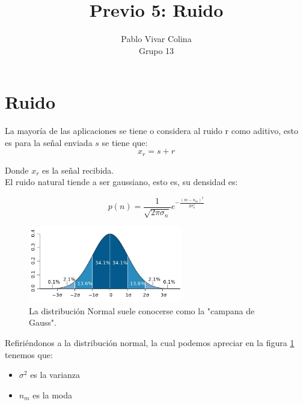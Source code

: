 \documentclass{article}
\title{Previo 5: Ruido}
\author{Pablo Vivar Colina\\
Grupo 13
}
\begin{document}
\maketitle

\section{Ruido}

La mayoría de las aplicaciones se tiene o considera al ruido r como aditivo, esto es para la señal enviada $s$ se tiene que:\citep{Capitulo1SC}\\

\begin{equation}
    x_r=s+r
\end{equation}

Donde $x_r$ es la señal recibida.\citep{Capitulo1SC}\\

El ruido natural tiende a ser gaussiano, esto es, su densidad es:\citep{Capitulo1SC}

\begin{equation}
    p(n)=\frac{1}{\sqrt{2 \pi \sigma_n}} e^{-\frac{(m-n_m)^2}{2 \sigma_n^2}}
\end{equation}

\begin{figure}[h!]
    \centering
    
   
\includegraphics[width=0.6\textwidth]{Imagenes/Standard_deviation_diagram.png}
\caption{ La distribución Normal suele conocerse como la "campana de Gauss".}
    \label{fig:distNorm}
 
\end{figure}


Refiriéndonos a la distribución normal, la cual podemos apreciar en la figura \ref{fig:distNorm} tenemos que:\citep{DistribucionNormal}\\

\begin{itemize}
    \item $\sigma^2$ es la varianza
    \item $n_m$ es la moda
\end{itemize}
\end{document}
